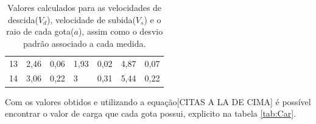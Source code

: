 \begin{table}[ht!]
\begin{tabular}{l|ll|ll|ll|}
13   & 2,46                      & 0,06               & 1,93                      & 0,02               & 4,87                  & 0,07          \\
\rowcolor[HTML]{C0C0C0} 
14   & 3,06                      & 0,22               & 3                         & 0,31               & 5,44                  & 0,22           \\ \hline 
\end{tabular}
\caption{Valores calculados para as velocidades de descida($V_d$), velocidade de subida($V_s$) e o raio de cada gota($a$), assim como o desvio padrão associado a cada medida.}
\label{tab:Vel}
\end{table}

Com os valores obtidos e  utilizando a equação[CITAS A LA DE CIMA] é possível encontrar o valor de carga que cada gota possui, explicito na tabela \ref{tab:Car}.


